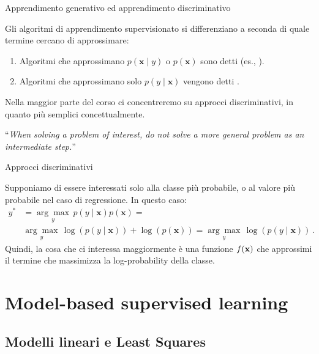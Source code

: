 \documentclass[12pt,aspectratio=169]{beamer}
\begin{document}
\begin{frame}{Apprendimento generativo ed apprendimento discriminativo}
	
	Gli algoritmi di apprendimento supervisionato si differenziano a seconda di quale termine cercano di approssimare:
	\begin{enumerate}
		\item Algoritmi che approssimano $p(\mathbf{x} \mid y)$ o $p(\mathbf{x})$ sono detti  (es., ).
		\item Algoritmi che approssimano solo $p(y \mid \mathbf{x})$ vengono detti .
	\end{enumerate}
	Nella maggior parte del corso ci concentreremo su approcci discriminativi, in quanto più semplici concettualmente.
	
	\begin{tcolorbox}
		{ ``\textit{When solving a problem of interest, do not solve a more general problem as an intermediate step.}''}
		\vskip0mm
		\hspace*{}
	\end{tcolorbox}
	
\end{frame}

\begin{frame}{Approcci discriminativi}
	
	Supponiamo di essere interessati solo alla classe più probabile, o al valore più probabile nel caso di regressione. In questo caso:
	\begin{align}
		y^* & = \underset{y}{\arg\max} \, p(y \mid \mathbf{x})p(\mathbf{x}) = \\ & \underset{y}{\arg\max} \, \log(p(y \mid \mathbf{x})) + \log(p(\mathbf{x})) = \underset{y}{\arg\max} \, \log(p(y \mid \mathbf{x})) \,.
	\end{align}
	Quindi, la cosa che ci interessa maggiormente è una funzione $f(\boldsymbol{\mathbf{x}})$ che approssimi il termine che massimizza la log-probability della classe.
	
\end{frame}

\section{Model-based supervised learning}
\subsection{Modelli lineari e Least Squares}
\end{document}
